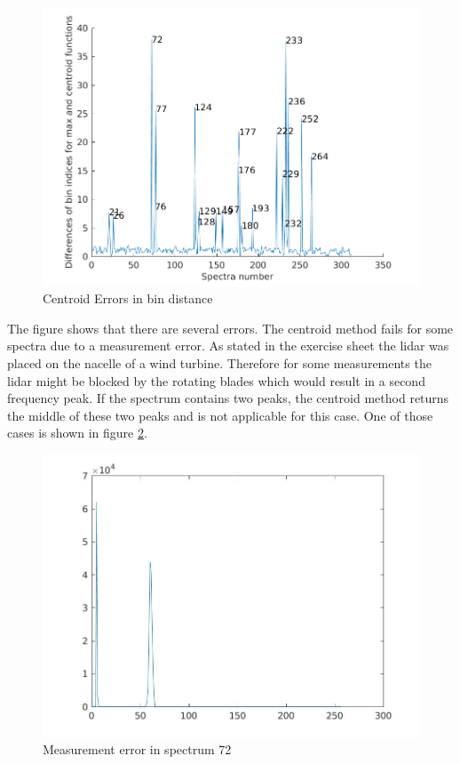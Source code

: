 \documentclass[10pt]{article}
\begin{document}
\begin{figure}[H]
\includegraphics[width=1\linewidth]{../Exercises_and_Tasks/ex1/figures/failures.png}
\caption{Centroid Errors in bin distance}
\label{fig:failures}
\end{figure}

The figure shows that there are several errors. The centroid method fails for some spectra due to a measurement error. As stated in the exercise sheet the lidar was placed on the nacelle of a wind turbine. Therefore for some measurements the lidar might be blocked by the rotating blades which would result in a second frequency peak. If the spectrum contains two peaks, the centroid method returns the middle of these two peaks and is not applicable for this case.
One of those cases is shown in figure \ref{fig:measurement_error}.

\begin{figure}[H]
\includegraphics[width=1\linewidth]{../Exercises_and_Tasks/ex1/figures/spectra_noisecancels_normed_72.jpg}
\caption{Measurement error in spectrum 72}
\label{fig:measurement_error}
\end{figure}
\end{document}
